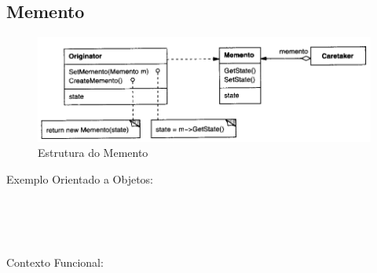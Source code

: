 \subsection{Memento}

\begin{figure}[htb]
	\caption{\label{fig_grafico}Estrutura do Memento}
	\begin{center}
	    \includegraphics[scale=0.5]{5_padroes-contexto-funcional/5.3_comportamentais/5.3.06_memento/diagram.png}
	\end{center}
\end{figure}

Exemplo Orientado a Objetos:

\begin{lstlisting}[caption={Memento Orientação a Objetos},label=oomemento]


    
\end{lstlisting}

Contexto Funcional:


\begin{lstlisting}[caption={Memento Funcional},label=fpmemento]
    

    
\end{lstlisting}